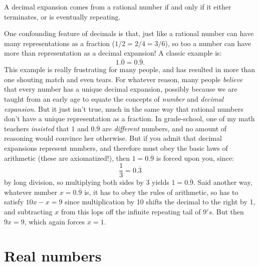 \documentclass[11pt,oneside]{amsart}
\begin{document}
\begin{proposition}\label{rat}
	A decimal expansion comes from a rational number if and only if it either terminates, or is eventually repeating.
\end{proposition}

One confounding feature of decimals is that, just like a rational number can have many representations as a fraction ($1/2 = 2/4 = 3/6$),
so too a number can have more than representation as a decimal expansion!  A classic example is:
$$
  1.\overline{0} = 0.\overline{9}.
$$ 
This example is really frustrating for many people, and has resulted in more than one shouting match and even tears. 
For whatever reason, many people {\em believe} that every number has a unique decimal expansion, possibly because
we are taught from an early age to equate the concepts of {\em number} and {\em decimal expansion}.  But it just isn't true,
much in the same way that rational numbers don't have a unique representation as a fraction.  In grade-school, one of my math teachers
{\em insisted} that $1$ and $0.\overline{9}$ are {\em different} numbers, and no amount of reasoning would convince her otherwise.  But if you
admit that decimal expansions represent numbers, and therefore must obey the basic laws of arithmetic (these are axiomatized!), then
$1=0.\overline{9}$ is forced upon you, since:
$$
\frac{1}{3} = 0.\overline{3}
$$
by long division, so multiplying both sides by 3 yields $1=0.\overline{9}$.  Said another way, whatever number $x=0.\overline{9}$
is, it has to obey the rules of arithmetic, so has to satisfy $10x - x = 9$ since multiplication by 10 shifts the decimal to the right by 1, 
and subtracting $x$ from this lops off the infinite repeating tail of $9's$.  But then $9x=9$, which again forces $x=1$.

\section{Real numbers}
\end{document}

